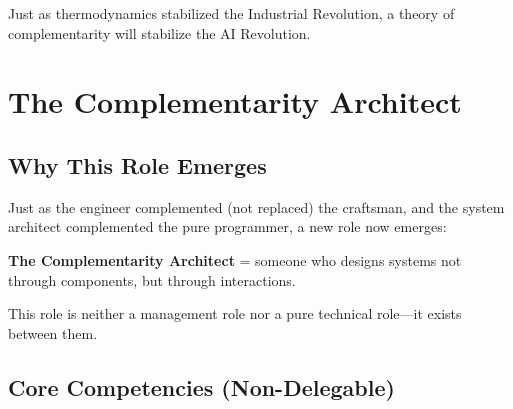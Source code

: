 \begin{tcolorbox}[colback=blue!5!white, colframe=blue!75!black,
    title=Central Thesis]
Just as thermodynamics stabilized the Industrial Revolution,
a theory of complementarity will stabilize the AI Revolution.
\end{tcolorbox}


\section{The Complementarity Architect}
\label{sec:thermo-architect}

\subsection{Why This Role Emerges}

Just as the engineer complemented (not replaced) the craftsman, and the system
architect complemented the pure programmer, a new role now emerges:

\begin{tcolorbox}[colback=purple!5!white, colframe=purple!75!black,
    title=Role Definition]
\textbf{The Complementarity Architect} = someone who designs systems not through
components, but through interactions.

This role is neither a management role nor a pure technical role---it exists
between them.
\end{tcolorbox}

\subsection{Core Competencies (Non-Delegable)}

